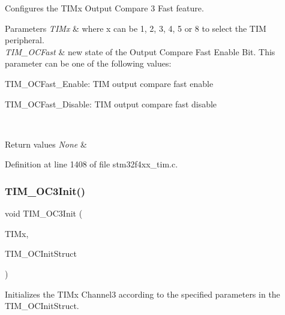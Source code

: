 Configures the T\+I\+Mx Output Compare 3 Fast feature. 


\begin{DoxyParams}{Parameters}
{\em T\+I\+Mx} & where x can be 1, 2, 3, 4, 5 or 8 to select the T\+IM peripheral. \\
\hline
{\em T\+I\+M\+\_\+\+O\+C\+Fast} & new state of the Output Compare Fast Enable Bit. This parameter can be one of the following values\+: \begin{DoxyItemize}
\item T\+I\+M\+\_\+\+O\+C\+Fast\+\_\+\+Enable\+: T\+IM output compare fast enable \item T\+I\+M\+\_\+\+O\+C\+Fast\+\_\+\+Disable\+: T\+IM output compare fast disable \end{DoxyItemize}
\\
\hline
\end{DoxyParams}

\begin{DoxyRetVals}{Return values}
{\em None} & \\
\hline
\end{DoxyRetVals}


Definition at line 1408 of file stm32f4xx\+\_\+tim.\+c.

\mbox{\label{group___t_i_m___group2_ga90d4a358d4e6d4c5ed17dc1d6beb5f30}} 
\subsubsection{\texorpdfstring{T\+I\+M\+\_\+\+O\+C3\+Init()}{TIM\_OC3Init()}}
{\footnotesize\ttfamily void T\+I\+M\+\_\+\+O\+C3\+Init (\begin{DoxyParamCaption}\item[{\hyperlink{struct_t_i_m___type_def}{T\+I\+M\+\_\+\+Type\+Def} $\ast$}]{T\+I\+Mx,  }\item[{\hyperlink{struct_t_i_m___o_c_init_type_def}{T\+I\+M\+\_\+\+O\+C\+Init\+Type\+Def} $\ast$}]{T\+I\+M\+\_\+\+O\+C\+Init\+Struct }\end{DoxyParamCaption})}



Initializes the T\+I\+Mx Channel3 according to the specified parameters in the T\+I\+M\+\_\+\+O\+C\+Init\+Struct. 



